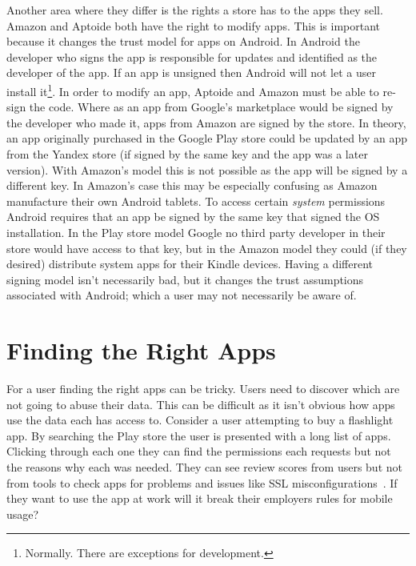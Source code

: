 \documentclass[thesis.tex]{subfiles}
\begin{document}
Another area where they differ is the rights a store has to the apps they sell.
Amazon and Aptoide both have the right to modify apps.
This is important because it changes the trust model for apps on Android.
In Android the developer who signs the app is responsible for updates and identified as the developer of the app.  If an app is unsigned then Android will not let a user install it\footnote{Normally. There are exceptions for development.}.  In order to modify an app, Aptoide and Amazon must be able to re-sign the code.  Where as an app from Google's marketplace would be signed by the developer who made it, apps from Amazon are signed by the store.
In theory, an app originally purchased in the Google Play store could be updated by an app from the Yandex store (if signed by the same key and the app was a later version).
With Amazon's model this is not possible as the app will be signed by a different key.
In Amazon's case this may be especially confusing as Amazon manufacture their own Android tablets.
To access certain \emph{system} permissions Android requires that an app be signed by the same key that signed the OS installation.
In the Play store model Google no third party developer in their store would have access to that key, but in the Amazon model they could (if they desired) distribute system apps for their Kindle devices.
Having a different signing model isn't necessarily bad, but it changes the trust assumptions associated with Android; which a user may not necessarily be aware of.


  \section{Finding the Right Apps}

For a user finding the right apps can be tricky.
Users need to discover which are not going to abuse their data.
This can be difficult as it isn't obvious how apps use the data each has access to.
Consider a user attempting to buy a flashlight app.
By searching the Play store the user is presented with a long list of apps.
Clicking through each one they can find the permissions each requests but not the reasons why each was needed.
They can see review scores from users but not from tools to check apps for problems and issues like SSL misconfigurations~\cite{fahl_why_2012}.
If they want to use the app at work will it break their employers rules for mobile usage?
\end{document}
